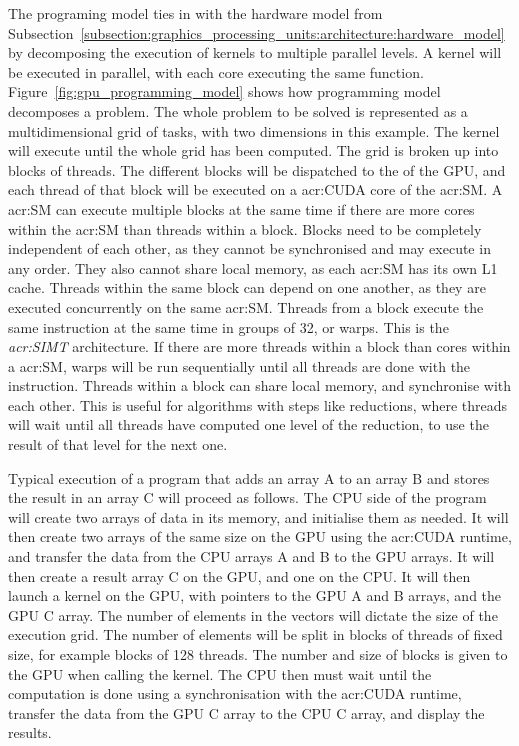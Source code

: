 The programing model ties in with the hardware model from
Subsection~\ref{subsection:graphics_processing_units:architecture:hardware_model} by decomposing the
execution of kernels to multiple parallel levels. A kernel will be executed in parallel, with each
core executing the same function. Figure~\ref{fig:gpu_programming_model} shows how programming model
decomposes a problem. The whole problem to be solved is represented as a multidimensional grid of
tasks, with two dimensions in this example. The kernel will execute until the whole grid has been
computed. The grid is broken up into blocks of threads. The different blocks will be dispatched to
the  of the GPU, and each thread of that block will be executed on a
\acrshort{acr:CUDA} core of the \acrshort{acr:SM}. A \acrshort{acr:SM} can execute multiple blocks
at the same time if there are more cores within the \acrshort{acr:SM} than threads within a block.
Blocks need to be completely independent of each other, as they cannot be synchronised and may
execute in any order. They also cannot share local memory, as each \acrshort{acr:SM} has its own L1
cache. Threads within the same block can depend on one another, as they are executed concurrently on
the same \acrshort{acr:SM}. Threads from a block execute the same instruction at the same time in
groups of 32, or warps. This is the \textit{\acrfull{acr:SIMT}} architecture. If there are more
threads within a block than cores within a \acrshort{acr:SM}, warps will be run sequentially until
all threads are done with the instruction. Threads within a block can share local memory, and
synchronise with each other. This is useful for algorithms with steps like reductions, where threads
will wait until all threads have computed one level of the reduction, to use the result of that
level for the next one.

Typical execution of a program that adds an array A to an array B and stores the result in an array
C will proceed as follows. The CPU side of the program will create two arrays of data in its memory,
and initialise them as needed. It will then create two arrays of the same size on the GPU using the
\acrshort{acr:CUDA} runtime, and transfer the data from the CPU arrays A and B to the GPU arrays. It
will then create a result array C on the GPU, and one on the CPU. It will then launch a kernel on
the GPU, with pointers to the GPU A and B arrays, and the GPU C array. The number of elements in the
vectors will dictate the size of the execution grid. The number of elements will be split in blocks
of threads of fixed size, for example blocks of 128 threads. The number and size of blocks is given
to the GPU when calling the kernel. The CPU then must wait until the computation is done using a
synchronisation with the \acrshort{acr:CUDA} runtime, transfer the data from the GPU C array to the
CPU C array, and display the results. 

